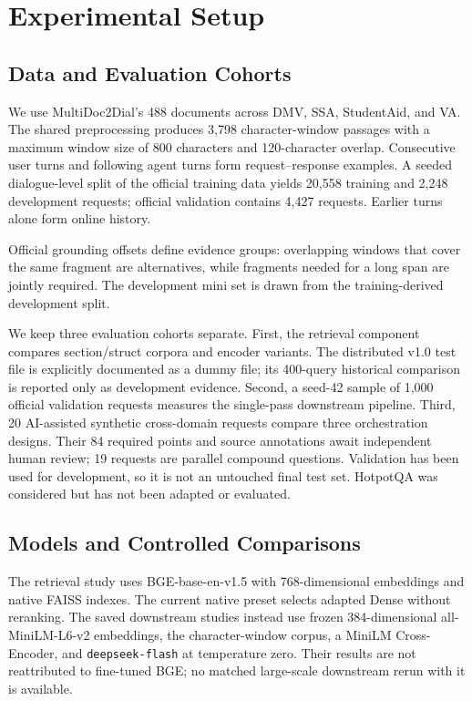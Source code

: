 \section{Experimental Setup}
\label{sec:setup}
\subsection{Data and Evaluation Cohorts}
We use MultiDoc2Dial's 488 documents across DMV, SSA, StudentAid, and VA. The shared preprocessing produces 3,798 character-window passages with a maximum window size of 800 characters and 120-character overlap. Consecutive user turns and following agent turns form request--response examples. A seeded dialogue-level split of the official training data yields 20,558 training and 2,248 development requests; official validation contains 4,427 requests. Earlier turns alone form online history.

Official grounding offsets define evidence groups: overlapping windows that cover the same fragment are alternatives, while fragments needed for a long span are jointly required. The development mini set is drawn from the training-derived development split.

We keep three evaluation cohorts separate. First, the retrieval component compares section/struct corpora and encoder variants. The distributed v1.0 test file is explicitly documented as a dummy file; its 400-query historical comparison is reported only as development evidence. Second, a seed-42 sample of 1,000 official validation requests measures the single-pass downstream pipeline. Third, 20 AI-assisted synthetic cross-domain requests compare three orchestration designs. Their 84 required points and source annotations await independent human review; 19 requests are parallel compound questions. Validation has been used for development, so it is not an untouched final test set. HotpotQA was considered but has not been adapted or evaluated.

\subsection{Models and Controlled Comparisons}
The retrieval study uses BGE-base-en-v1.5 with 768-dimensional embeddings and native FAISS indexes. The current native preset selects adapted Dense without reranking. The saved downstream studies instead use frozen 384-dimensional all-MiniLM-L6-v2 embeddings, the character-window corpus, a MiniLM Cross-Encoder, and \texttt{deepseek-flash} at temperature zero. Their results are not reattributed to fine-tuned BGE; no matched large-scale downstream rerun with it is available.


